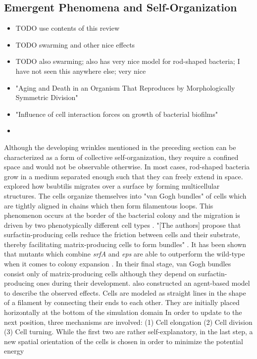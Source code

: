 \documentclass{article}
\begin{document}
\subsection{Emergent Phenomena and Self-Organization}

\begin{itemize}
    \item \cite{Nagarajan2022} TODO use contents of this review
    \item \cite{Ingham2008} TODO swarming and other nice effects
    \item \cite{Starru2007} TODO also swarming; also has very nice model for rod-shaped bacteria; I have
        not seen this anywhere else; very nice
    \item \cite{Stewart2005} "Aging and Death in an Organism That Reproduces by Morphologically
        Symmetric Division"
    \item \cite{Jin2020} "Influence of cell interaction forces on growth of bacterial biofilms"
    \item 
\end{itemize}

Although the developing wrinkles mentioned in the preceding section can be characterized as a form of collective self-organization, they require a confined space and would not be observable otherwise.
In most cases, rod-shaped bacteria grow in a medium separated enough such that they can freely extend in space.
\cite{vanGestel2015} explored how \ac{bsubtilis} migrates over a surface by forming multicellular structures.
The cells organize themselves into "van Gogh bundles" of cells which are tightly aligned in chains which then form filamentous loops.
This phenomenon occurs at the border of the bacterial colony and the migration is driven by two phenotypically different cell types \cite{Lpez2010}.
"[The authors] propose that surfactin-producing cells reduce the friction between cells and their substrate, thereby facilitating matrix-producing cells to form bundles" \cite{vanGestel2015}.
It has been shown that mutants which combine \textit{srfA} and \textit{eps} are able to outperform the wild-type when it comes to colony expansion \cite{Velicer2009}.
In their final stage, van Gogh bundles consist only of matrix-producing cells although they depend on surfactin-producing ones during their development.
\cite{vanGestel2015} also constructed an agent-based model to describe the observed effects.
Cells are modeled as straight lines in the shape of a filament by connecting their ends to each other.
They are initially placed horizontally at the bottom of the simulation domain In order to update to the next position, three mechanisms are involved: (1) Cell elongation (2) Cell division (3) Cell turning.
While the first two are rather self-explanatory, in the last step, a new spatial orientation of the cells is chosen in order to minimize the potential energy
\end{document}
